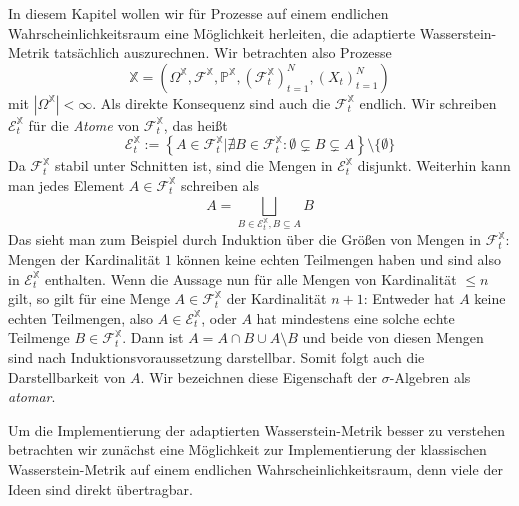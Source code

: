 In diesem Kapitel wollen wir für Prozesse auf einem endlichen Wahrscheinlichkeitsraum eine Möglichkeit herleiten, die adaptierte Wasserstein-Metrik tatsächlich auszurechnen. Wir betrachten also Prozesse 
$$\mathbb{X} = \left( \Omega^\mathbb{X}, \mathcal{F}^\mathbb{X}, \mathbb{P}^\mathbb{X}, (\mathcal{F}_t^\mathbb{X})_{t=1}^N, (X_t)_{t=1}^N\right)$$
mit $|\Omega^\mathbb{X}| < \infty$. Als direkte Konsequenz sind auch die $\mathcal{F}_t^\mathbb{X}$ endlich. Wir schreiben $\mathcal{E}_t^\mathbb{X}$ für die \emph{Atome} von $\mathcal{F}_t^\mathbb{X}$, das heißt
$$\mathcal{E}_t^\mathbb{X} := \left\{A \in \mathcal{F}_t^\mathbb{X}  \vert \nexists B \in \mathcal{F}_t^\mathbb{X}: \emptyset \subsetneq B \subsetneq A \right\} \setminus \{\emptyset\}$$
Da $\mathcal{F}_t^\mathbb{X}$ stabil unter Schnitten ist, sind die Mengen in $\mathcal{E}_t^\mathbb{X}$ disjunkt. Weiterhin kann man jedes Element $A \in \mathcal{F}_t^\mathbb{X}$ schreiben als 
$$A = \bigsqcup_{B \in \mathcal{E}_t^\mathbb{X}, B \subseteq A} B$$
Das sieht man zum Beispiel durch Induktion über die Größen von Mengen in $\mathcal{F}_t^\mathbb{X}$: Mengen der Kardinalität $1$ können keine echten Teilmengen haben und sind also in $\mathcal{E}_t^\mathbb{X}$ enthalten. Wenn die Aussage nun für alle Mengen von Kardinalität $\leq n$ gilt, so gilt für eine Menge $A \in \mathcal{F}_t^\mathbb{X}$ der Kardinalität $n+1$: Entweder hat $A$ keine echten Teilmengen, also $A \in \mathcal{E}_t^\mathbb{X}$, oder $A$ hat mindestens eine solche echte Teilmenge $B \in \mathcal{F}_t^\mathbb{X}$. Dann ist $A=A\cap B \cup A \setminus B$ und beide von diesen Mengen sind nach Induktionsvoraussetzung darstellbar. Somit folgt auch die Darstellbarkeit von $A$. Wir bezeichnen diese Eigenschaft der $\sigma$-Algebren als \emph{atomar}.

Um die Implementierung der adaptierten Wasserstein-Metrik besser zu verstehen betrachten wir zunächst eine Möglichkeit zur Implementierung der klassischen Wasserstein-Metrik auf einem endlichen Wahrscheinlichkeitsraum, denn viele der Ideen sind direkt übertragbar.

